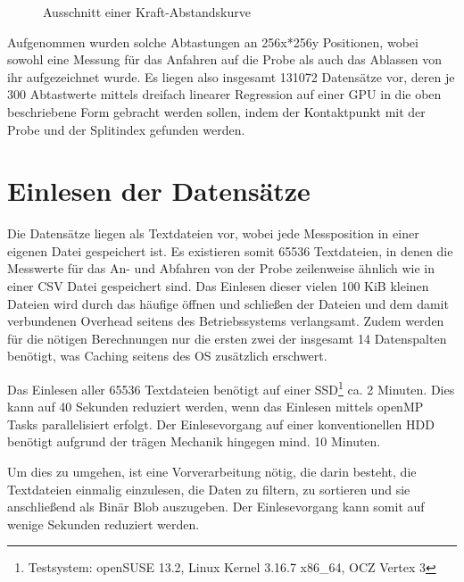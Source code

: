 \begin{figure}[h!]
\centering
\caption{Ausschnitt einer Kraft-Abstandskurve}
\label{fig:kraftbsp}
\end{figure}

Aufgenommen wurden solche Abtastungen an 256x*256y Positionen, wobei sowohl eine Messung für das Anfahren auf die Probe als auch das Ablassen von ihr aufgezeichnet wurde. Es liegen also insgesamt 131072 Datensätze vor, deren je 300 Abtastwerte mittels dreifach linearer Regression auf einer GPU in die oben beschriebene Form gebracht werden sollen, indem der Kontaktpunkt mit der Probe und der Splitindex gefunden werden.

\pagebreak
\section{Einlesen der Datensätze}
\label{einlesen}
Die Datensätze liegen als Textdateien vor, wobei jede Messposition in einer eigenen Datei gespeichert ist. Es existieren somit 65536 Textdateien, in denen die Messwerte für das An- und Abfahren von der Probe zeilenweise ähnlich wie in einer CSV Datei gespeichert sind.
Das Einlesen dieser vielen 100 KiB kleinen Dateien wird durch das häufige öffnen und schließen der Dateien und dem damit verbundenen Overhead seitens des Betriebssystems verlangsamt. Zudem werden für die nötigen Berechnungen nur die ersten zwei der insgesamt 14 Datenspalten benötigt, was Caching seitens des OS zusätzlich erschwert.


Das Einlesen aller 65536 Textdateien benötigt auf einer SSD\footnote{Testsystem: openSUSE 13.2, Linux Kernel 3.16.7 x86\_64, OCZ Vertex 3} ca. 2 Minuten. Dies kann auf 40 Sekunden reduziert werden, wenn das Einlesen mittels openMP Tasks parallelisiert erfolgt.
Der Einlesevorgang auf einer konventionellen HDD benötigt aufgrund der trägen Mechanik hingegen mind. 10 Minuten.

Um dies zu umgehen, ist eine Vorverarbeitung nötig, die darin besteht, die Textdateien einmalig einzulesen, die Daten zu filtern, zu sortieren und sie anschließend als Binär Blob auszugeben. Der Einlesevorgang kann somit auf wenige Sekunden reduziert werden.

